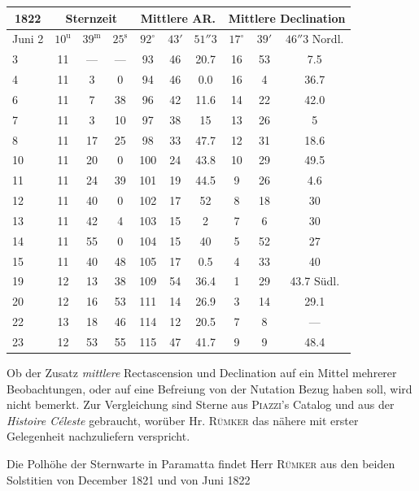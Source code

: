 \begin{center}
\small\setlength{\tabcolsep}{3pt}
\begin{tabular}{l|ccc|ccc|ccc}
\multicolumn{1}{c|}{1822} & \multicolumn{3}{c|}{Sternzeit} & \multicolumn{3}{c|}{Mittlere AR.} & \multicolumn{3}{c}{Mittlere Declination} \\
\hline
Juni 2 & $10^{\mathrm{u}}$ & $39^{\mathrm{m}}$ & $25^{\mathrm{s}}$ & $92^{\circ}$ & $43'$ & $51''3$ & $17^{\circ}$ & $39'$ & $46''3$ Nordl. \\
3 & 11 & --- & --- & 93 & 46 & 20.7 & 16 & 53 & 7.5 \\
4 & 11 & 3 & 0 & 94 & 46 & 0.0 & 16 & 4 & 36.7 \\
6 & 11 & 7 & 38 & 96 & 42 & 11.6 & 14 & 22 & 42.0 \\
7 & 11 & 3 & 10 & 97 & 38 & 15 & 13 & 26 & 5 \\
8 & 11 & 17 & 25 & 98 & 33 & 47.7 & 12 & 31 & 18.6 \\
10 & 11 & 20 & 0 & 100 & 24 & 43.8 & 10 & 29 & 49.5 \\
11 & 11 & 24 & 39 & 101 & 19 & 44.5 & 9 & 26 & 4.6 \\
12 & 11 & 40 & 0 & 102 & 17 & 52 & 8 & 18 & 30 \\
13 & 11 & 42 & 4 & 103 & 15 & 2 & 7 & 6 & 30 \\
14 & 11 & 55 & 0 & 104 & 15 & 40 & 5 & 52 & 27 \\
15 & 11 & 40 & 48 & 105 & 17 & 0.5 & 4 & 33 & 40 \\
19 & 12 & 13 & 38 & 109 & 54 & 36.4 & 1 & 29 & 43.7 Südl. \\
20 & 12 & 16 & 53 & 111 & 14 & 26.9 & 3 & 14 & 29.1 \\
22 & 13 & 18 & 46 & 114 & 12 & 20.5 & 7 & 8 & --- \\
23 & 12 & 53 & 55 & 115 & 47 & 41.7 & 9 & 9 & 48.4 \\
\end{tabular}
\end{center}

Ob der Zusatz \emph{mittlere} Rectascension und Declination auf ein Mittel mehrerer
Beobachtungen, oder auf eine Befreiung von der Nutation Bezug haben soll, wird nicht bemerkt.
Zur Vergleichung sind Sterne aus \textsc{Piazzi}'s Catalog und aus der \emph{Histoire Céleste} gebraucht,
worüber Hr. \textsc{Rümker} das nähere mit erster Gelegenheit nachzuliefern verspricht.

Die Polhöhe der Sternwarte in Paramatta findet Herr \textsc{Rümker} aus den beiden Solstitien von
December 1821 und von Juni 1822

